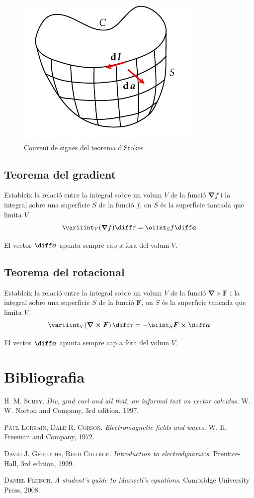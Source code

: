 \documentclass[catalan,a4paper,twoside,11pt]{article}
\begin{document}
\begin{figure}[h]
\centering
     \includegraphics{Imatges/Stokes.pdf}
\caption{Conveni de signes del teorema d'Stokes}
\label{pic:signe-teo-stockes}
\end{figure}


\subsection{Teorema del gradient}
Estableix la relaci\'{o} entre la integral sobre un volum $V$ de la funci\'{o} $\boldsymbol{\nabla}f$ i la integral sobre una superf\'{\i}cie $S$ de la funci\'{o} $f$, on $S$ \'{e}s la superf\'{\i}cie tancada que limita $V$.
\begin{equation}
    \variiint_V(\boldsymbol{\nabla}f)\diff \tau = \oiint_S f\boldsymbol{\diff a}
\end{equation}

El vector $\boldsymbol{\diff a}$ apunta sempre cap a fora del volum $V$.

\subsection{Teorema del rotacional}
Estableix la relaci\'{o} entre la integral sobre un volum $V$ de la funci\'{o} $\boldsymbol{\nabla\times F}$ i la integral sobre una superf\'{\i}cie $S$ de la funci\'{o} $\boldsymbol{F}$, on $S$ \'{e}s la superf\'{\i}cie tancada que limita $V$.
\begin{equation}
    \variiint_V(\boldsymbol{\nabla\times F})\,\diff \tau=-\oiint_S
    \boldsymbol{F\times\diff a}
\end{equation}

El vector $\boldsymbol{\diff a}$ apunta sempre cap a fora del volum $V$.

\section{Bibliografia}

\textsc{H. M. Schey}. \textsl{Div, grad curl and all that, an informal text on vector calculus}.  W. W. Norton and Company, 3rd edition, 1997.

\textsc{Paul Lorrain, Dale R. Corson}. \textsl{Electromagnetic fields and waves}.  W. H. Freeman and Company, 1972.

\textsc{David J. Griffiths, Reed College}. \textsl{Introduction to electrodynamics}. Prentice-Hall, 3rd edition, 1999.

\textsc{Daniel Fleisch}. \textsl{A student's guide to Maxwell's equations}. Cambridge University Press, 2008.
\end{document}
